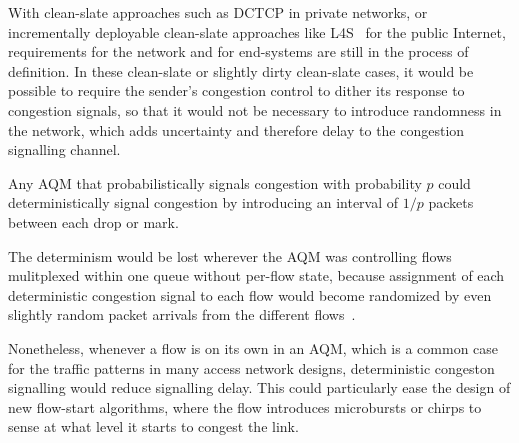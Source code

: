With clean-slate approaches such as DCTCP in private networks, or incrementally deployable clean-slate approaches like L4S~\cite{Briscoe16a:l4s-arch_ID} for the public Internet, requirements for the network and for end-systems are still in the process of definition. In these clean-slate or slightly dirty clean-slate cases, it would be possible to require the sender's congestion control to dither its response to congestion signals, so that it would not be necessary to introduce randomness in the network, which adds uncertainty and therefore delay to the congestion signalling channel. 

Any AQM that probabilistically signals congestion with probability \(p\) could deterministically signal congestion by introducing an interval of \(1/p\) packets between each drop or mark. 

The determinism would be lost wherever the AQM was controlling flows mulitplexed within one queue without per-flow state, because assignment of each deterministic congestion signal to each flow would become randomized by even slightly random packet arrivals from the different flows~\cite{Briscoe15d:PIE_rvw}.

Nonetheless, whenever a flow is on its own in an AQM, which is a common case for the traffic patterns in many access network designs,  deterministic congeston signalling would reduce signalling delay. This could particularly ease the design of new flow-start algorithms, where the flow introduces microbursts or chirps to sense at what level it starts to congest the link.



